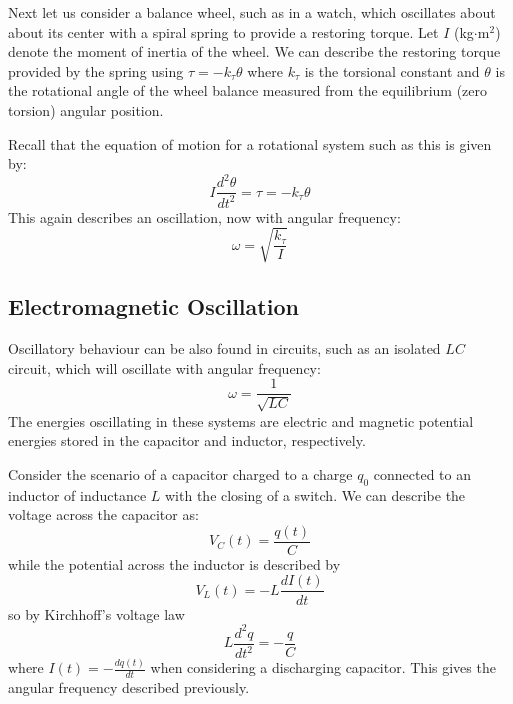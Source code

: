 \documentclass[12pt, a4paper, oneside, openright, titlepage]{book}
\begin{document}
Next let us consider a balance wheel, such as in a watch, which oscillates about about its center with a spiral spring to provide a restoring torque. Let $I$ (kg$\cdot$m$^2$) denote the moment of inertia of the wheel. We can describe the restoring torque provided by the spring using $\tau = -k_\tau\theta$ where $k_\tau$ is the torsional constant and $\theta$ is the rotational angle of the wheel balance measured from the equilibrium (zero torsion) angular position.


Recall that the equation of motion for a rotational system such as this is given by:
\begin{equation}
    I\frac{d^2\theta}{dt^2} = \tau=-k_\tau\theta
\end{equation}
This again describes an oscillation, now with angular frequency:
\begin{equation}
    \omega = \sqrt{\frac{k_\tau}{I}}
\end{equation}



\subsection{Electromagnetic Oscillation}

Oscillatory behaviour can be also found in circuits, such as an isolated $LC$ circuit, which will oscillate with angular frequency:
\begin{equation}
    \omega = \frac{1}{\sqrt{LC}}
\end{equation}
The energies oscillating in these systems are electric and magnetic potential energies stored in the capacitor and inductor, respectively.

Consider the scenario of a capacitor charged to a charge $q_0$ connected to an inductor of inductance $L$ with the closing of a switch. We can describe the voltage across the capacitor as:
\begin{equation}
    V_C(t) = \frac{q(t)}{C}
\end{equation}
while the potential across the inductor is described by
\begin{equation}
    V_L(t) = -L\frac{dI(t)}{dt}
\end{equation}
so by Kirchhoff's voltage law
\begin{equation}
    L\frac{d^2q}{dt^2} = -\frac{q}{C}
\end{equation}
where $I(t) = -\frac{dq(t)}{dt}$ when considering a discharging capacitor. This gives the angular frequency described previously.
\end{document}
